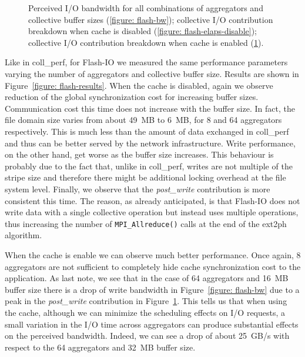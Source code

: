 \begin{figure}[]
\begin{subfigure}[]{\textwidth}
  \caption{}
  \label{figure: flash-elaps-enable}
  \end{subfigure}
  \caption{Perceived I/O bandwidth for all combinations of aggregators and collective buffer sizes (\ref{figure: flash-bw}); collective I/O contribution breakdown 
  when cache is disabled (\ref{figure: flash-elaps-disable}); collective I/O contribution breakdown when cache is enabled (\ref{figure: flash-elaps-enable}).}
  \label{figure: flash-results}
\end{figure}

Like in coll\_perf, for Flash-IO we measured the same performance parameters varying the number of aggregators and collective buffer size. Results are shown in Figure~\ref{figure:
flash-results}. When the cache is disabled, again we observe reduction of the global synchronization cost for increasing buffer sizes. Communication cost this time does not increase 
with the buffer size. In fact, the file domain size varies from about 49~MB to 6~MB, for 8 and 64 aggregators respectively. This is much less than the amount of data exchanged in 
coll\_perf and thus can be better served by the network infrastructure. Write performance, on the other hand, get worse as the buffer size increases. This behaviour is probably due 
to the fact that, unlike in coll\_perf, writes are not multiple of the stripe size and therefore there might be additional locking overhead at the file system level.
Finally, we observe that the \textit{post\_write} contribution is more consistent this time. The reason, as already anticipated, is that Flash-IO does not write data with a single
collective operation but instead uses multiple operations, thus increasing the number of \texttt{MPI\_Allreduce()} calls at the end of the ext2ph algorithm.

When the cache is enable we can observe much better performance. Once again, 8 aggregators are not sufficient to completely hide cache synchronization cost to the application. As last
note, we see that in the case of 64 aggregators and 16~MB buffer size there is a drop of write bandwidth in Figure~\ref{figure: flash-bw} due to a peak in the \textit{post\_write}
contribution in Figure~\ref{figure: flash-elaps-enable}. This tells us that when using the cache, although we can minimize the scheduling effects on I/O requests, a small variation 
in the I/O time across aggregators can produce substantial effects on the perceived bandwidth. Indeed, we can see a drop of about 25~GB/s with respect to the 64 aggregators and 
32~MB buffer size.

